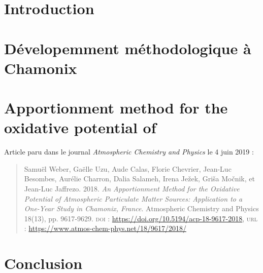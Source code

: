 \section{Introduction}

\section{Dévelopemment méthodologique à Chamonix}%
\label{sec:dévelopemment_méthodologique_à_chamonix}

\section{Apportionment method for the oxidative potential of \PMdix{}}

Article paru dans le journal \textit{Atmospheric Chemistry and Physics} le 4 juin 2019 :

\begin{quote}
    Samuël Weber, Gaëlle Uzu, Aude Calas, Florie Chevrier, Jean-Luc Besombes,
    Aurélie Charron, Dalia Salameh, Irena Ježek, Griša Močnik, et Jean-Luc Jaffrezo. 2018.
    \textit{An Apportionment Method for the Oxidative Potential of Atmospheric Particulate
    Matter Sources: Application to a One-Year Study in Chamonix, France}. Atmospheric
    Chemistry and Physics 18(13), pp. 9617‑9629.
    \textsc{doi} : \href{10.5194/acp-18-9617-2018}{https://doi.org/10.5194/acp-18-9617-2018},
    \textsc{url} : \url{https://www.atmos-chem-phys.net/18/9617/2018/}
\end{quote}

\label{sec:weber_et_al_2018}



\section{Conclusion}
